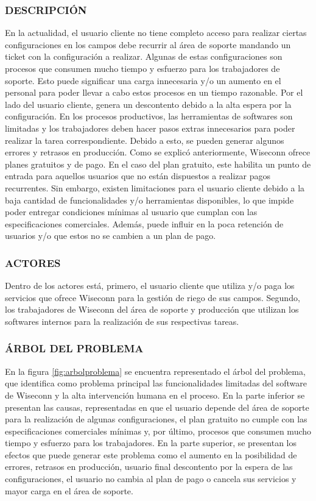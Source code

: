 \subsubsection{DESCRIPCIÓN}
En la actualidad, el usuario cliente no tiene completo acceso para realizar ciertas configuraciones en los campos debe recurrir al área de soporte mandando un ticket con la configuración a realizar. Algunas de estas configuraciones son procesos que consumen mucho tiempo y esfuerzo para los trabajadores de soporte. Esto puede significar una carga innecesaria y/o un aumento en el personal para poder llevar a cabo estos procesos en un tiempo razonable. Por el lado del usuario cliente, genera un descontento debido a la alta espera por la configuración.
En los procesos productivos, las herramientas de softwares son limitadas y los trabajadores deben hacer pasos extras innecesarios para poder realizar la tarea correspondiente. Debido a esto, se pueden generar algunos errores y retrasos en producción.
Como se explicó anteriormente, Wiseconn ofrece planes gratuitos y de pago. En el caso del plan gratuito, este habilita un punto de entrada para aquellos usuarios que no están dispuestos a realizar pagos recurrentes. Sin embargo, existen limitaciones para el usuario cliente debido a la baja cantidad de funcionalidades y/o herramientas disponibles, lo que impide poder entregar condiciones mínimas al usuario que cumplan con las especificaciones comerciales. Además, puede influir en la poca retención de usuarios y/o que estos no se cambien a un plan de pago.

\subsubsection{ACTORES}
Dentro de los actores está, primero, el usuario cliente que utiliza y/o paga los servicios que ofrece Wiseconn para la gestión de riego de sus campos. Segundo, los trabajadores de Wiseconn del área de soporte y producción que utilizan los softwares internos para la realización de sus respectivas tareas.

\subsubsection{ÁRBOL DEL PROBLEMA}
En la figura \ref{fig:arbolproblema} se encuentra representado el árbol del problema, que identifica como problema principal las funcionalidades limitadas del software de Wiseconn y la alta intervención humana en el proceso.
En la parte inferior se presentan las causas, representadas en que el usuario depende del área de soporte para la realización de algunas configuraciones, el plan gratuito no cumple con las especificaciones comerciales mínimas y, por último, procesos que consumen mucho tiempo y esfuerzo para los trabajadores.
En la parte superior, se presentan los efectos que puede generar este problema como el aumento en la posibilidad de errores, retrasos en producción, usuario final descontento por la espera de las configuraciones, el usuario no cambia al plan de pago o cancela sus servicios y mayor carga en el área de soporte.

